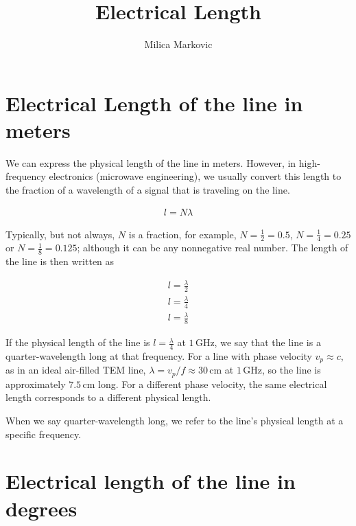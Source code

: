 \documentclass{ximera}
\title{Electrical Length}
\author{Milica Markovic}
\begin{document}
  
\begin{abstract}  

\end{abstract}  
\maketitle    





\section{Electrical Length of the line in meters}

We can express the physical length of the line in meters. However, in high-frequency electronics (microwave engineering), we usually convert this length to the fraction of a wavelength of a signal that is traveling on the line. 


\begin{eqnarray}
 l=N \lambda 
\end{eqnarray}
 

Typically, but not always, $N$ is a fraction, for example,  $N=\frac{1}{2}=0.5$, $N=\frac{1}{4}=0.25$ or $N=\frac{1}{8}=0.125$; although it can be any nonnegative real number. The length of the line is then written as


\begin{eqnarray}
 l=\frac{\lambda}{2}  \\
 l=\frac{\lambda}{4}  \\
  l=\frac{\lambda}{8}  
\end{eqnarray}
 


If the physical length of the line is $l=\frac{\lambda}{4}$ at $1\,\mathrm{GHz}$, we say that the line is a quarter-wavelength long at that frequency. For a line with phase velocity $v_p\approx c$, as in an ideal air-filled TEM line, $\lambda=v_p/f\approx 30\,\mathrm{cm}$ at $1\,\mathrm{GHz}$, so the line is approximately $7.5\,\mathrm{cm}$ long. For a different phase velocity, the same electrical length corresponds to a different physical length.


When we say quarter-wavelength long, we refer to the line’s physical length at a specific frequency. 

\section{Electrical length of the line in degrees}
\end{document}
